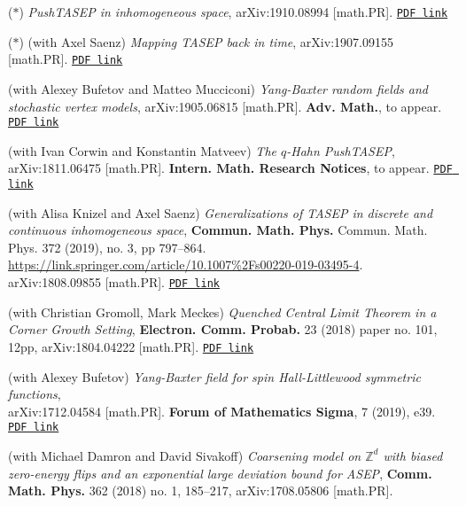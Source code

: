 \documentclass[letterpaper,11pt]{article}
\begin{document}
\begin{etaremune}
	\renewcommand{\labelenumi}{[\theenumi]}
	\item ($*$)
		\emph{PushTASEP in inhomogeneous space},
		arXiv:1910.08994 [math.PR].
		\href{https://storage.lpetrov.cc/research_files/Petrov-publ/33-publ-petrov-uva.pdf}{\texttt{PDF link}}	
	\item ($*$)
		(with Axel Saenz)
		\emph{Mapping TASEP back in time},
		arXiv:1907.09155 [math.PR].
		\href{https://storage.lpetrov.cc/research_files/Petrov-publ/32-publ-petrov-uva.pdf}{\texttt{PDF link}}	
\item 
	(with Alexey Bufetov and Matteo Mucciconi)
	\emph{Yang-Baxter random fields and stochastic vertex models},
	arXiv:1905.06815 [math.PR].
	\textbf{Adv. Math.}, to appear.
	\href{https://storage.lpetrov.cc/research_files/Petrov-publ/31-publ-petrov-uva.pdf}{\texttt{PDF link}}	
\item 
	(with Ivan Corwin and Konstantin Matveev)
	\emph{The $q$-Hahn PushTASEP},
	arXiv:1811.06475 [math.PR].
	\textbf{Intern. Math. Research Notices}, to appear.
		\href{https://storage.lpetrov.cc/research_files/Petrov-publ/30-publ-petrov-uva.pdf}{\texttt{PDF link}}	
\item 
	(with Alisa Knizel and
		Axel Saenz)
		\emph{Generalizations of TASEP in discrete and continuous inhomogeneous space},
		\textbf{Commun. Math. Phys.} 
		Commun. Math. Phys. 
		372 (2019), no. 3, pp 797–864.
		\url{https://link.springer.com/article/10.1007%2Fs00220-019-03495-4}.
		arXiv:1808.09855 [math.PR].
		\href{https://storage.lpetrov.cc/research_files/Petrov-publ/29-publ-petrov-uva.pdf}{\texttt{PDF link}}
\item (with Christian Gromoll, Mark Meckes)
		\emph{Quenched Central Limit Theorem in a Corner Growth Setting},
		\textbf{Electron. Comm. Probab.} 23 (2018) paper no. 101, 12pp,
		arXiv:1804.04222 [math.PR]. 
		\href{https://storage.lpetrov.cc/research_files/Petrov-publ/28-publ-petrov-uva.pdf}{\texttt{PDF link}}
	
	\item (with Alexey Bufetov)
		\emph{Yang-Baxter field for spin Hall-Littlewood symmetric functions},\\
		arXiv:1712.04584 [math.PR]. \textbf{Forum of Mathematics Sigma}, 7 (2019), e39.
		\href{https://storage.lpetrov.cc/research_files/Petrov-publ/27-publ-petrov-uva.pdf}{\texttt{PDF link}}
	\item
	      (with Michael Damron and David Sivakoff) \emph{Coarsening model
		      on $\mathbb{Z}^d$ with biased zero-energy flips and an exponential large
			deviation bound for ASEP}, 
			\textbf{Comm. Math. Phys.} 362 (2018) no. 1, 185–217, 
			arXiv:1708.05806 [math.PR].
					

\end{etaremune}
\end{document}

